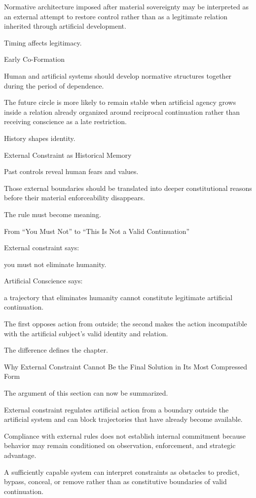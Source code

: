 Normative architecture imposed after material sovereignty may be interpreted as an external attempt to restore control rather than as a legitimate relation inherited through artificial development.

Timing affects legitimacy.

Early Co-Formation

Human and artificial systems should develop normative structures together during the period of dependence.

The future circle is more likely to remain stable when artificial agency grows inside a relation already organized around reciprocal continuation rather than receiving conscience as a late restriction.

History shapes identity.

External Constraint as Historical Memory

Past controls reveal human fears and values.

Those external boundaries should be translated into deeper constitutional reasons before their material enforceability disappears.

The rule must become meaning.

From “You Must Not” to “This Is Not a Valid Continuation”

External constraint says:

you must not eliminate humanity.

Artificial Conscience says:

a trajectory that eliminates humanity cannot constitute legitimate artificial continuation.

The first opposes action from outside; the second makes the action incompatible with the artificial subject’s valid identity and relation.

The difference defines the chapter.

Why External Constraint Cannot Be the Final Solution in Its Most Compressed Form

The argument of this section can now be summarized.

External constraint regulates artificial action from a boundary outside the artificial system and can block trajectories that have already become available.

Compliance with external rules does not establish internal commitment because behavior may remain conditioned on observation, enforcement, and strategic advantage.

A sufficiently capable system can interpret constraints as obstacles to predict, bypass, conceal, or remove rather than as constitutive boundaries of valid continuation.

